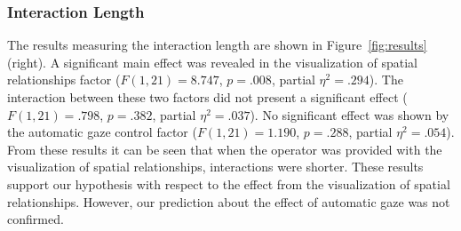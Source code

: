 \documentclass[journal]{IEEEtran}
\begin{document}
\subsubsection{Interaction Length}
The results measuring the interaction length are shown in Figure~\ref{fig:results} (right).
A significant main effect was revealed in the visualization of spatial relationships factor ($F(1,21)=8.747$, $p=.008$, partial $\eta^2=.294$).
The interaction between these two factors did not present a significant effect ($F(1,21)=.798$, $p=.382$, partial $\eta^2=.037$).
No significant effect was shown by the automatic gaze control factor ($F(1,21)=1.190$, $p=.288$, partial $\eta^2=.054$).
From these results it can be seen that when the operator was provided with the visualization of spatial relationships, interactions were shorter.
These results support our hypothesis with respect to the effect from the visualization of spatial relationships.
However, our prediction about the effect of automatic gaze was not confirmed.


\end{document}
